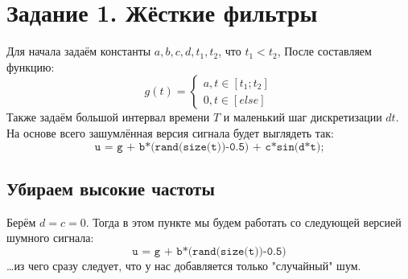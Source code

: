 \chapter{Задание 1. Жёсткие фильтры}
\label{ch:chap2}


\lstset{style=mystyle}




Для начала задаём константы $a, b, c, d, t_1, t_2$, что $t_1 < t_2$, После составляем функцию:
$$
g(t) = \begin{cases}
        a, t\in[t_1 ; t_2] \\
        0, t\in[else]
       \end{cases}
$$
Также задаём большой интервал времени $T$ и маленький шаг дискретизации $dt$. На основе всего зашумлённая версия сигнала будет выглядеть так:
$$
\texttt{u = g + b*(rand(size(t))-0.5) + c*sin(d*t);}
$$

\section{Убираем высокие частоты}

Берём $d=c=0$. Тогда в этом пункте мы будем работать со следующей версией шумного сигнала:
$$
\texttt{u = g + b*(rand(size(t))-0.5)}
$$\dots из чего сразу следует, что у нас добавляется только "случайный" шум.



  

